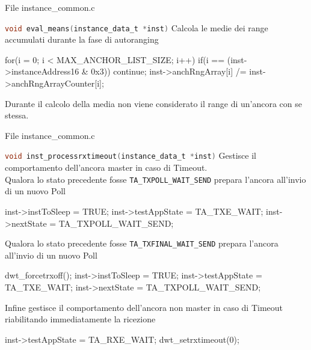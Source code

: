 \begin{frame}[fragile]{File instance\_common.c}
  \begin{block}{\lstinline[language=C]!void eval_means(instance_data_t *inst)!}
    Calcola le medie dei range accumulati durante la fase di autoranging
    \begin{C}
      for(i = 0; i < MAX_ANCHOR_LIST_SIZE; i++)
      {
        if(i == (inst->instanceAddress16 & 0x3))
          continue;
        inst->anchRngArray[i] /= inst->anchRngArrayCounter[i];
      }
    \end{C}
    Durante il calcolo della media \alert{non} viene considerato il range di un'ancora con se stessa.
  \end{block}
\end{frame}

\begin{frame}[fragile,shrink=30]{File instance\_common.c}
  \begin{block}{\lstinline[language=C]!void inst_processrxtimeout(instance_data_t *inst)!}
    Gestisce il comportamento dell'ancora master in caso di Timeout.\\
    Qualora lo stato precedente fosse \lstinline[language=C]!TA_TXPOLL_WAIT_SEND! prepara l'ancora all'invio di un nuovo Poll
    \begin{C}
      inst->instToSleep = TRUE;
      inst->testAppState = TA_TXE_WAIT;
      inst->nextState = TA_TXPOLL_WAIT_SEND;
    \end{C}
    Qualora lo stato precedente fosse \lstinline[language=C]!TA_TXFINAL_WAIT_SEND! prepara l'ancora all'invio di un nuovo Poll    
    \begin{C}
      dwt_forcetrxoff();
      inst->instToSleep = TRUE;
      inst->testAppState = TA_TXE_WAIT;
      inst->nextState = TA_TXPOLL_WAIT_SEND;
    \end{C}
    Infine gestisce il comportamento dell'ancora \alert{non} master in caso di Timeout riabilitando immediatamente la ricezione
    \begin{C}
      inst->testAppState = TA_RXE_WAIT;
      dwt_setrxtimeout(0);
    \end{C}
  \end{block}
\end{frame}

